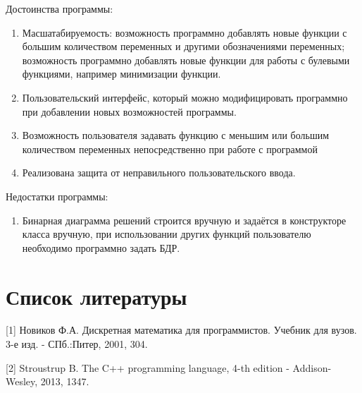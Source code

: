 \documentclass[a4paper]{article}
\theoremstyle{plain}
\theoremstyle{definition*}
\theoremstyle{remark}
\begin{document}
Достоинства программы: 
\begin{enumerate}
    \item Масшатабируемость: возможность программно добавлять
        новые функции с большим количеством переменных и другими
        обозначениями переменных; возможность программно добавлять
        новые функции для работы с булевыми функциями, например 
        минимизации функции. 
    \item Пользовательский интерфейс, который можно модифицировать
        программно при добавлении новых возможностей программы.
    \item Возможность пользователя задавать функцию с меньшим или 
        большим количеством переменных непосредственно при работе
        с программой
    \item Реализована защита от неправильного пользовательского ввода. 
\end{enumerate}


Недостатки программы:
\begin{enumerate}
    \item Бинарная диаграмма решений строится вручную и задаётся в 
        конструкторе класса вручную, при использовании других 
        функций пользователю необходимо программно задать
        БДР.
\end{enumerate}
\newpage
\section*{Список литературы}
[1] Новиков Ф.А. Дискретная математика для программистов. Учебник для вузов.
3-е изд. - СПб.:Питер, 2001, 304.

[2] Stroustrup B. The C++ programming language, 4-th edition - Addison-Wesley, 2013, 1347. 
\end{document}
